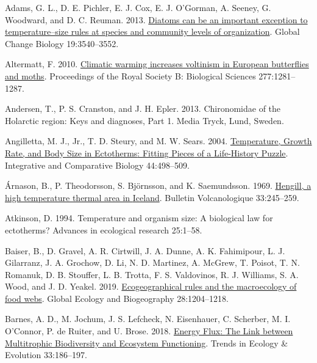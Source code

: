\documentclass[
]{article}
\newlength{\cslhangindent}
\newlength{\cslentryspacingunit} %
\newenvironment{CSLReferences}[2] %
 {%
  \setlength{\parindent}{0pt}
  \ifodd #1
  \let\oldpar\par
  \def\par{\hangindent=\cslhangindent\oldpar}
  \fi
  \setlength{\parskip}{#2\cslentryspacingunit}
 }%
 {}
\numberwithin{equation}
\begin{document}
\hypertarget{refs}{}
\begin{CSLReferences}{1}{0}
\leavevmode{}%
Adams, G. L., D. E. Pichler, E. J. Cox, E. J. O'Gorman, A. Seeney, G.
Woodward, and D. C. Reuman. 2013.
\href{https://doi.org/10.1111/gcb.12285}{Diatoms can be an important
exception to temperature--size rules at species and community levels of
organization}. Global Change Biology 19:3540--3552.

\leavevmode{}%
Altermatt, F. 2010.
\href{https://doi.org/10.1098/rspb.2009.1910}{Climatic warming increases
voltinism in {European} butterflies and moths}. Proceedings of the Royal
Society B: Biological Sciences 277:1281--1287.

\leavevmode{}%
Andersen, T., P. S. Cranston, and J. H. Epler. 2013. Chironomidae of the
{Holarctic} region: {Keys} and diagnoses, {Part} 1. Media Tryck, Lund,
Sweden.

\leavevmode{}%
Angilletta, M. J., Jr., T. D. Steury, and M. W. Sears. 2004.
\href{https://doi.org/10.1093/icb/44.6.498}{Temperature, {Growth Rate},
and {Body Size} in {Ectotherms}: {Fitting Pieces} of a {Life-History
Puzzle}}. Integrative and Comparative Biology 44:498--509.

\leavevmode{}%
Árnason, B., P. Theodorsson, S. Björnsson, and K. Saemundsson. 1969.
\href{https://doi.org/10.1007/BF02596720}{Hengill, a high temperature
thermal area in {Iceland}}. Bulletin Volcanologique 33:245--259.

\leavevmode{}%
Atkinson, D. 1994. Temperature and organism size: A biological law for
ectotherms? Advances in ecological research 25:1--58.

\leavevmode{}%
Baiser, B., D. Gravel, A. R. Cirtwill, J. A. Dunne, A. K. Fahimipour, L.
J. Gilarranz, J. A. Grochow, D. Li, N. D. Martinez, A. McGrew, T.
Poisot, T. N. Romanuk, D. B. Stouffer, L. B. Trotta, F. S. Valdovinos,
R. J. Williams, S. A. Wood, and J. D. Yeakel. 2019.
\href{https://doi.org/10.1111/geb.12925}{Ecogeographical rules and the
macroecology of food webs}. Global Ecology and Biogeography
28:1204--1218.

\leavevmode{}%
Barnes, A. D., M. Jochum, J. S. Lefcheck, N. Eisenhauer, C. Scherber, M.
I. O'Connor, P. de Ruiter, and U. Brose. 2018.
\href{https://doi.org/10.1016/j.tree.2017.12.007}{Energy {Flux}: {The
Link} between {Multitrophic Biodiversity} and {Ecosystem Functioning}}.
Trends in Ecology \& Evolution 33:186--197.


\end{CSLReferences}
\end{document}
